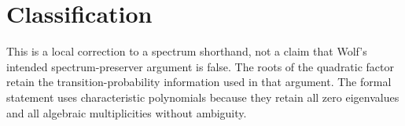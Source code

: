 \documentclass{article}
\begin{document}
\section{Classification}

This is a local correction to a spectrum shorthand, not a claim that Wolf's
intended spectrum-preserver argument is false. The roots of the quadratic
factor retain the transition-probability information used in that argument.
The formal statement uses characteristic polynomials because they retain all
zero eigenvalues and all algebraic multiplicities without ambiguity.



\end{document}

